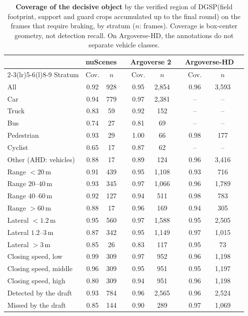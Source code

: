 \documentclass[10pt,letterpaper]{article}
\newcommand{\method}{DGSP\xspace}
\newcommand{\na}{--}
\theoremstyle{remark}
\theoremstyle{plain}
\theoremstyle{definition}
\begin{document}
\begin{table}[!tbp]
\centering
\caption{\textbf{Coverage of the decisive object} by the verified region of \method (field footprint, support and guard crops accumulated up to the final round) on the frames that require braking, by stratum ($n$: frames). Coverage is box-center geometry, not detection recall. On Argoverse-HD, the annotations do not separate vehicle classes.}
\label{tab:coverage}
\footnotesize
\setlength{\tabcolsep}{2.4pt}
\begin{tabular}{@{}lccccccccc@{}}
\toprule
 & \multicolumn{2}{c}{nuScenes} & & \multicolumn{2}{c}{Argoverse 2} & & \multicolumn{2}{c}{Argoverse-HD} \\
\cmidrule(lr){2-3}\cmidrule(lr){5-6}\cmidrule(l){8-9}
Stratum & Cov. & $n$ & & Cov. & $n$ & & Cov. & $n$ \\
\midrule
All & 0.92 & 928 & & 0.95 & 2{,}854 & & 0.96 & 3{,}593 \\
\midrule
Car & 0.94 & 779 & & 0.97 & 2{,}381 & & \na & \na \\
Truck & 0.83 & 59 & & 0.92 & 152 & & \na & \na \\
Bus & 0.74 & 27 & & 0.81 & 69 & & \na & \na \\
Pedestrian & 0.93 & 29 & & 1.00 & 66 & & 0.98 & 177 \\
Cyclist & 0.65 & 17 & & 0.87 & 62 & & \na & \na \\
Other (AHD: vehicles) & 0.88 & 17 & & 0.89 & 124 & & 0.96 & 3{,}416 \\
\midrule
Range $<20$\,m & 0.91 & 439 & & 0.95 & 1{,}108 & & 0.93 & 716 \\
Range $20$--$40$\,m & 0.93 & 345 & & 0.97 & 1{,}066 & & 0.96 & 1{,}789 \\
Range $40$--$60$\,m & 0.92 & 127 & & 0.94 & 511 & & 0.98 & 783 \\
Range $>60$\,m & 0.88 & 17 & & 0.96 & 169 & & 0.94 & 305 \\
\midrule
Lateral $<1.2$\,m & 0.95 & 560 & & 0.97 & 1{,}588 & & 0.95 & 2{,}505 \\
Lateral $1.2$--$3$\,m & 0.87 & 342 & & 0.95 & 1{,}149 & & 0.97 & 1{,}015 \\
Lateral $>3$\,m & 0.85 & 26 & & 0.83 & 117 & & 0.95 & 73 \\
\midrule
Closing speed, low & 0.99 & 309 & & 0.97 & 952 & & 0.96 & 1{,}198 \\
Closing speed, middle & 0.96 & 309 & & 0.95 & 951 & & 0.95 & 1{,}197 \\
Closing speed, high & 0.80 & 309 & & 0.94 & 951 & & 0.96 & 1{,}198 \\
\midrule
Detected by the draft & 0.93 & 784 & & 0.96 & 2{,}565 & & 0.96 & 2{,}524 \\
Missed by the draft & 0.85 & 144 & & 0.90 & 289 & & 0.97 & 1{,}069 \\
\bottomrule
\end{tabular}
\end{table}
\end{document}

